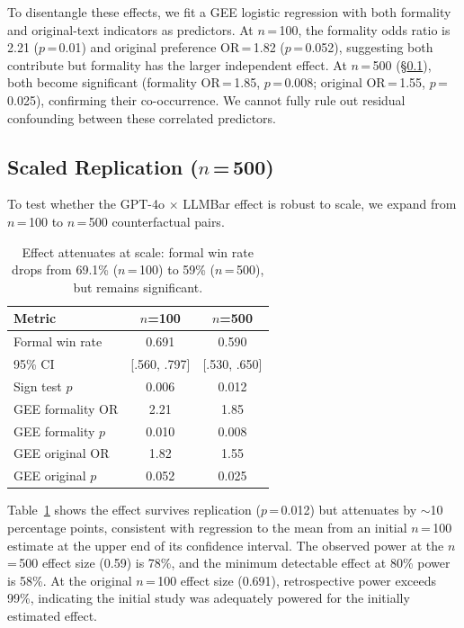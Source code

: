 \documentclass[11pt,a4paper]{article}
\begin{document}
To disentangle these effects, we fit a GEE logistic regression with both formality and original-text indicators as predictors.
At $n$\,=\,100, the formality odds ratio is 2.21 ($p$\,=\,0.01) and original preference OR\,=\,1.82 ($p$\,=\,0.052), suggesting both contribute but formality has the larger independent effect.
At $n$\,=\,500 (\S\ref{sec:scale}), both become significant (formality OR\,=\,1.85, $p$\,=\,0.008; original OR\,=\,1.55, $p$\,=\,0.025), confirming their co-occurrence.
We cannot fully rule out residual confounding between these correlated predictors.

\subsection{Scaled Replication ($n$\,=\,500)}
\label{sec:scale}

To test whether the GPT-4o $\times$ LLMBar effect is robust to scale, we expand from $n$\,=\,100 to $n$\,=\,500 counterfactual pairs.

\begin{table}[t]
\centering
\small
\caption{Effect attenuates at scale: formal win rate drops from 69.1\% ($n$\,=\,100) to 59\% ($n$\,=\,500), but remains significant.}
\label{tab:scale}
\begin{tabular}{lcc}
\toprule
\textbf{Metric} & \textbf{$n$=100} & \textbf{$n$=500} \\
\midrule
Formal win rate & 0.691 & 0.590 \\
95\% CI & [.560, .797] & [.530, .650] \\
Sign test $p$ & 0.006 & 0.012 \\
GEE formality OR & 2.21 & 1.85 \\
GEE formality $p$ & 0.010 & 0.008 \\
GEE original OR & 1.82 & 1.55 \\
GEE original $p$ & 0.052 & 0.025 \\
\bottomrule
\end{tabular}
\end{table}

Table~\ref{tab:scale} shows the effect survives replication ($p$\,=\,0.012) but attenuates by $\sim$10 percentage points, consistent with regression to the mean from an initial $n$\,=\,100 estimate at the upper end of its confidence interval.
The observed power at the $n$\,=\,500 effect size (0.59) is 78\%, and the minimum detectable effect at 80\% power is 58\%.
At the original $n$\,=\,100 effect size (0.691), retrospective power exceeds 99\%, indicating the initial study was adequately powered for the initially estimated effect.
\end{document}
